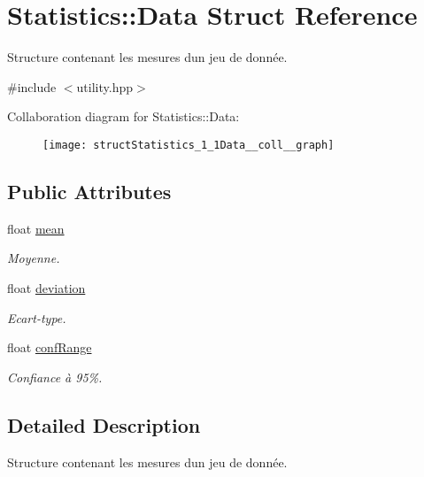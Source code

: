 \hypertarget{structStatistics_1_1Data}{}\section{Statistics\+:\+:Data Struct Reference}
\label{structStatistics_1_1Data}


Structure contenant les mesures d\textquotesingle{}un jeu de donnée.  




{\ttfamily \#include $<$utility.\+hpp$>$}



Collaboration diagram for Statistics\+:\+:Data\+:\nopagebreak
\begin{figure}[H]
\begin{center}
\leavevmode
\texttt{[image: structStatistics\_1\_1Data\_\_coll\_\_graph]}
\end{center}
\end{figure}
\subsection*{Public Attributes}
\begin{DoxyCompactItemize}
\item 
float \hyperlink{structStatistics_1_1Data_a70c674f35bce1803c894c1df2649ac3f}{mean}
\begin{DoxyCompactList}\small\item\em Moyenne. \end{DoxyCompactList}\item 
float \hyperlink{structStatistics_1_1Data_a4ab98072b8f7055a828ea80077a059f0}{deviation}
\begin{DoxyCompactList}\small\item\em Ecart-\/type. \end{DoxyCompactList}\item 
float \hyperlink{structStatistics_1_1Data_a098a51c15f9d1c2b0d50fd89fc956c06}{conf\+Range}
\begin{DoxyCompactList}\small\item\em Confiance à 95\%. \end{DoxyCompactList}\end{DoxyCompactItemize}


\subsection{Detailed Description}
Structure contenant les mesures d\textquotesingle{}un jeu de donnée. 

